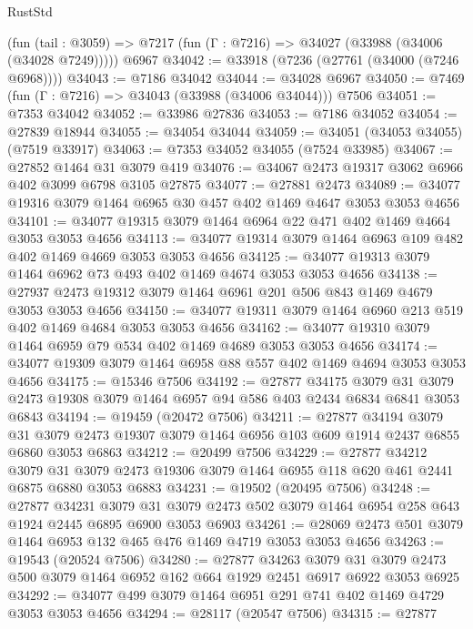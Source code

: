\begin{lexlean}{RustStd}
\begin{coremodule}
{\begin{coremodule}
{{{{{{{{{{{{{{{{{{{{{{{{{{{{{{{{    (fun (tail : @3059) => @7217 (fun (Γ : @7216) => @34027 (@33988 (@34006 (@34028 @7249)))))
    @6967
@34042 := @33918 (@7236 (@27761 (@34000 (@7246 @6968))))
@34043 := @7186 @34042
@34044 := @34028 @6967
@34050 := @7469 (fun (Γ : @7216) => @34043 (@33988 (@34006 @34044))) @7506
@34051 := @7353 @34042
@34052 := @33986 @27836
@34053 := @7186 @34052
@34054 := @27839 @18944
@34055 := @34054 @34044
@34059 := @34051 (@34053 @34055) (@7519 @33917)
@34063 := @7353 @34052 @34055 (@7524 @33985)
@34067 := @27852 @1464 @31 @3079 @419
@34076 := @34067 @2473 @19317 @3062 @6966 @402 @3099 @6798 @3105 @27875
@34077 := @27881 @2473
@34089 := @34077 @19316 @3079 @1464 @6965 @30 @457 @402 @1469 @4647 @3053 @3053 @4656
@34101 := @34077 @19315 @3079 @1464 @6964 @22 @471 @402 @1469 @4664 @3053 @3053 @4656
@34113 := @34077 @19314 @3079 @1464 @6963 @109 @482 @402 @1469 @4669 @3053 @3053 @4656
@34125 := @34077 @19313 @3079 @1464 @6962 @73 @493 @402 @1469 @4674 @3053 @3053 @4656
@34138 := @27937 @2473 @19312 @3079 @1464 @6961 @201 @506 @843 @1469 @4679 @3053 @3053 @4656
@34150 := @34077 @19311 @3079 @1464 @6960 @213 @519 @402 @1469 @4684 @3053 @3053 @4656
@34162 := @34077 @19310 @3079 @1464 @6959 @79 @534 @402 @1469 @4689 @3053 @3053 @4656
@34174 := @34077 @19309 @3079 @1464 @6958 @88 @557 @402 @1469 @4694 @3053 @3053 @4656
@34175 := @15346 @7506
@34192 := @27877
    @34175
    @3079
    @31
    @3079
    @2473
    @19308
    @3079
    @1464
    @6957
    @94
    @586
    @403
    @2434
    @6834
    @6841
    @3053
    @6843
@34194 := @19459 (@20472 @7506)
@34211 := @27877
    @34194
    @3079
    @31
    @3079
    @2473
    @19307
    @3079
    @1464
    @6956
    @103
    @609
    @1914
    @2437
    @6855
    @6860
    @3053
    @6863
@34212 := @20499 @7506
@34229 := @27877
    @34212
    @3079
    @31
    @3079
    @2473
    @19306
    @3079
    @1464
    @6955
    @118
    @620
    @461
    @2441
    @6875
    @6880
    @3053
    @6883
@34231 := @19502 (@20495 @7506)
@34248 := @27877
    @34231
    @3079
    @31
    @3079
    @2473
    @502
    @3079
    @1464
    @6954
    @258
    @643
    @1924
    @2445
    @6895
    @6900
    @3053
    @6903
@34261 := @28069 @2473 @501 @3079 @1464 @6953 @132 @465 @476 @1469 @4719 @3053 @3053 @4656
@34263 := @19543 (@20524 @7506)
@34280 := @27877
    @34263
    @3079
    @31
    @3079
    @2473
    @500
    @3079
    @1464
    @6952
    @162
    @664
    @1929
    @2451
    @6917
    @6922
    @3053
    @6925
@34292 := @34077 @499 @3079 @1464 @6951 @291 @741 @402 @1469 @4729 @3053 @3053 @4656
@34294 := @28117 (@20547 @7506)
@34315 := @27877
}}}}}}}}}}}}}}}}}}}}}}}}}}}}}}}}
\end{coremodule}}
\end{coremodule}
\end{lexlean}
